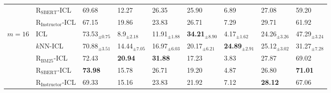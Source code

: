 \begin{tabular}{lllllllll}
 & $\text{R}_{\text{SBERT}}$-ICL & 69.68 & 12.27 & 26.35 & 25.90 & 6.89 & 27.08 & 59.20 \\
 & $\text{R}_{\text{Instructor}}$-ICL & 67.15 & 19.86 & 23.83 & 26.71 & 7.29 & 29.71 & 61.92 \\
\cline{1-9}
\multirow[t]{5}{*}{$m=16$} & ICL & 73.53$_{\pm0.75}$ & 8.9$_{\pm2.18}$ & 11.91$_{\pm1.88}$ & \textbf{34.21$_{\pm8.90}$} & 4.17$_{\pm1.62}$ & 24.26$_{\pm3.26}$ & 47.29$_{\pm3.24}$ \\
 & $k$NN-ICL & 70.88$_{\pm3.51}$ & 14.44$_{\pm7.05}$ & 16.97$_{\pm6.03}$ & 20.17$_{\pm6.21}$ & \textbf{24.89$_{\pm2.91}$} & 25.12$_{\pm3.02}$ & 31.27$_{\pm7.28}$ \\
 & $\text{R}_{\text{BM25}}$-ICL & 72.43 & \textbf{20.94} & \textbf{31.88} & 17.23 & 3.83 & 27.87 & 69.02 \\
 & $\text{R}_{\text{SBERT}}$-ICL & \textbf{73.98} & 15.78 & 26.71 & 19.20 & 4.87 & 26.80 & \textbf{71.01} \\
 & $\text{R}_{\text{Instructor}}$-ICL & 69.33 & 15.16 & 23.83 & 21.92 & 7.12 & \textbf{28.12} & 67.06 \\
\cline{1-9}
\bottomrule
\end{tabular}
